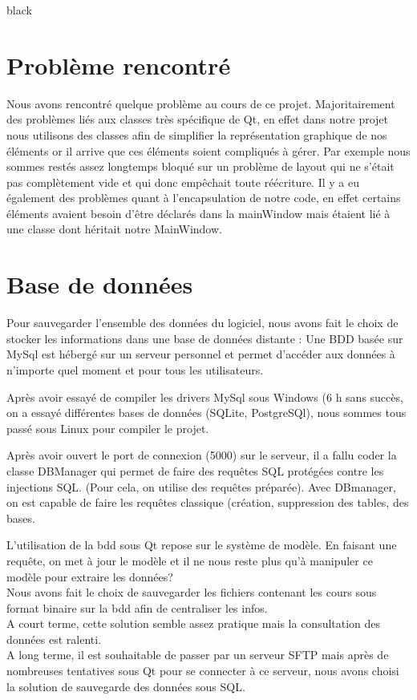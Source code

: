 \begin{items}{black}{\Bullet}
\section{Problème rencontré}

Nous avons rencontré quelque problème au cours de ce projet. Majoritairement des problèmes liés aux classes très spécifique de Qt, en effet dans notre projet nous utilisons des classes afin de simplifier la représentation graphique de nos éléments or il arrive que ces éléments soient compliqués à gérer. Par exemple nous sommes restés assez longtemps bloqué sur un problème de layout qui ne s’était pas complètement vide et qui donc empêchait toute réécriture. Il y a eu également des problèmes quant à l’encapsulation de notre code, en effet certains éléments avaient besoin d’être déclarés dans la mainWindow mais étaient lié à une classe dont héritait notre MainWindow.


\section{Base de données}

Pour sauvegarder l'ensemble des données du logiciel, nous avons fait le choix de stocker les informations dans une base de données distante : Une BDD basée sur MySql est hébergé sur un serveur personnel et permet d'accéder aux données à n'importe quel moment et pour tous les utilisateurs.

Après avoir essayé de compiler les drivers MySql sous Windows (6 h sans succès, on a essayé différentes bases de données (SQLite, PostgreSQl), nous sommes tous passé sous Linux pour compiler le projet.


Après avoir ouvert le port de connexion (5000) sur le serveur, il a fallu coder la classe DBManager qui permet de faire des requêtes SQL protégées contre les injections SQL. (Pour cela, on utilise des requêtes préparée). 
Avec DBmanager, on est capable de faire les requêtes classique (création, suppression des tables, des bases. 

L'utilisation de la bdd sous Qt repose sur le système de modèle. En faisant une requête, on met à jour le modèle et il ne nous reste plus qu'à manipuler ce modèle pour extraire les données?\\


Nous avons fait le choix de sauvegarder les fichiers contenant les cours sous format binaire sur la bdd afin de centraliser les infos.\\
A court terme, cette solution semble assez pratique mais la consultation des données est ralenti.\\
A long terme, il est souhaitable de passer par un serveur SFTP mais après de nombreuses tentatives sous Qt pour se connecter à ce serveur, nous avons choisi la solution de sauvegarde des données sous SQL.\\


\end{items}
